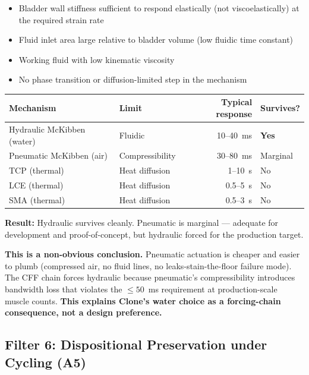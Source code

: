 \documentclass[11pt, a4paper]{article}
\begin{document}
\begin{itemize}[nosep]
  \item Bladder wall stiffness sufficient to respond elastically
        (not viscoelastically) at the required strain rate
  \item Fluid inlet area large relative to bladder volume
        (low fluidic time constant)
  \item Working fluid with low kinematic viscosity
  \item No phase transition or diffusion-limited step in the
        mechanism
\end{itemize}

\begin{center}
\begin{tabular}{@{}llrl@{}}
\toprule
\textbf{Mechanism} & \textbf{Limit} & \textbf{Typical response} &
  \textbf{Survives?} \\
\midrule
Hydraulic McKibben (water) & Fluidic & 10--40~ms &
  \textcolor{nm-green}{\textbf{Yes}} \\
Pneumatic McKibben (air) & Compressibility & 30--80~ms &
  \textcolor{nm-orange}{Marginal} \\
TCP (thermal) & Heat diffusion & 1--10~s &
  \textcolor{nm-red}{No} \\
LCE (thermal) & Heat diffusion & 0.5--5~s &
  \textcolor{nm-red}{No} \\
SMA (thermal) & Heat diffusion & 0.5--3~s &
  \textcolor{nm-red}{No} \\
\bottomrule
\end{tabular}
\end{center}

\textbf{Result:} Hydraulic survives cleanly. Pneumatic is
marginal --- adequate for development and proof-of-concept, but
hydraulic forced for the production target.

\textbf{This is a non-obvious conclusion.} Pneumatic actuation is
cheaper and easier to plumb (compressed air, no fluid lines, no
leaks-stain-the-floor failure mode). The CFF chain forces
hydraulic because pneumatic's compressibility introduces
bandwidth loss that violates the $\leq 50$~ms requirement at
production-scale muscle counts. \textbf{This explains Clone's
water choice as a forcing-chain consequence, not a design
preference.}

\subsection{Filter 6: Dispositional Preservation under Cycling (A5)}
\end{document}
